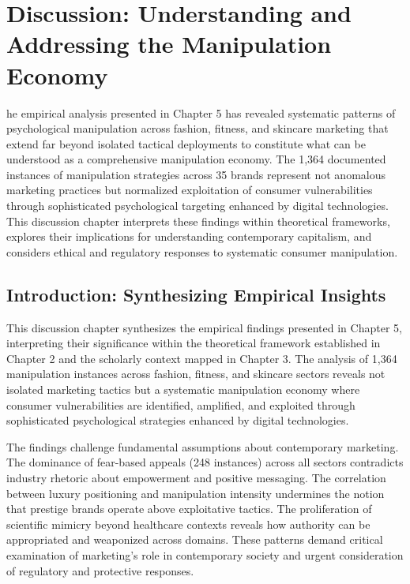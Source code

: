 
\chapter{Discussion: Understanding and Addressing the Manipulation Economy}
\label{ch:discussion}

he empirical analysis presented in Chapter 5 has revealed systematic patterns of psychological manipulation across fashion, fitness, and skincare marketing that extend far beyond isolated tactical deployments to constitute what can be understood as a comprehensive manipulation economy. The 1,364 documented instances of manipulation strategies across 35 brands represent not anomalous marketing practices but normalized exploitation of consumer vulnerabilities through sophisticated psychological targeting enhanced by digital technologies. This discussion chapter interprets these findings within theoretical frameworks, explores their implications for understanding contemporary capitalism, and considers ethical and regulatory responses to systematic consumer manipulation.

\section{Introduction: Synthesizing Empirical Insights}
\label{sec:discussion_intro}

This discussion chapter synthesizes the empirical findings presented in Chapter 5, interpreting their significance within the theoretical framework established in Chapter 2 and the scholarly context mapped in Chapter 3. The analysis of 1,364 manipulation instances across fashion, fitness, and skincare sectors reveals not isolated marketing tactics but a systematic manipulation economy where consumer vulnerabilities are identified, amplified, and exploited through sophisticated psychological strategies enhanced by digital technologies.

The findings challenge fundamental assumptions about contemporary marketing. The dominance of fear-based appeals (248 instances) across all sectors contradicts industry rhetoric about empowerment and positive messaging. The correlation between luxury positioning and manipulation intensity undermines the notion that prestige brands operate above exploitative tactics. The proliferation of scientific mimicry beyond healthcare contexts reveals how authority can be appropriated and weaponized across domains. These patterns demand critical examination of marketing's role in contemporary society and urgent consideration of regulatory and protective responses.

